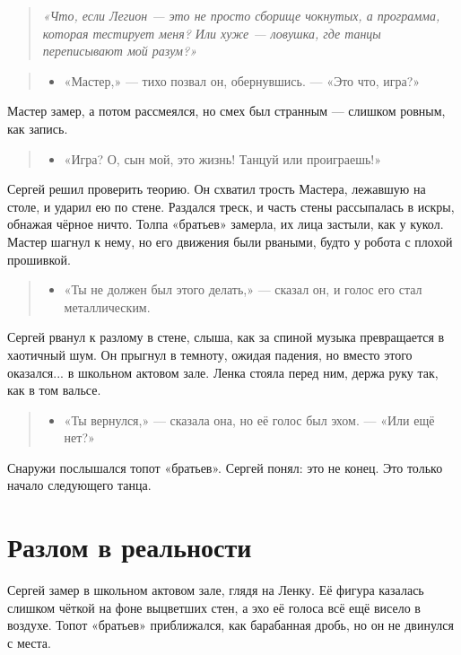 \documentclass[12pt,a4paper]{book}
\newenvironment{dialogue}{\begin{quote}\itshape\begin{itemize}\item[]}{\end{itemize}\end{quote}}
\newenvironment{innerthought}{\begin{quote}\small\itshape}{\end{quote}}
\begin{document}
\begin{innerthought}
«Что, если Легион — это не просто сборище чокнутых, а программа, которая тестирует меня? Или хуже — ловушка, где танцы переписывают мой разум?»
\end{innerthought}

\begin{dialogue}
«Мастер,» --- тихо позвал он, обернувшись. --- «Это что, игра?» \\
\end{dialogue}

Мастер замер, а потом рассмеялся, но смех был странным --- слишком ровным, как запись.

\begin{dialogue}
«Игра? О, сын мой, это жизнь! Танцуй или проиграешь!»
\end{dialogue}

Сергей решил проверить теорию. Он схватил трость Мастера, лежавшую на столе, и ударил ею по стене. Раздался треск, и часть стены рассыпалась в искры, обнажая чёрное ничто. Толпа «братьев» замерла, их лица застыли, как у кукол. Мастер шагнул к нему, но его движения были рваными, будто у робота с плохой прошивкой.

\begin{dialogue}
«Ты не должен был этого делать,» --- сказал он, и голос его стал металлическим.
\end{dialogue}

Сергей рванул к разлому в стене, слыша, как за спиной музыка превращается в хаотичный шум. Он прыгнул в темноту, ожидая падения, но вместо этого оказался... в школьном актовом зале. Ленка стояла перед ним, держа руку так, как в том вальсе.

\begin{dialogue}
«Ты вернулся,» --- сказала она, но её голос был эхом. --- «Или ещё нет?» \\
\end{dialogue}

Снаружи послышался топот «братьев». Сергей понял: это не конец. Это только начало следующего танца.

\section{Разлом в реальности}

Сергей замер в школьном актовом зале, глядя на Ленку. Её фигура казалась слишком чёткой на фоне выцветших стен, а эхо её голоса всё ещё висело в воздухе. Топот «братьев» приближался, как барабанная дробь, но он не двинулся с места.
\end{document}
